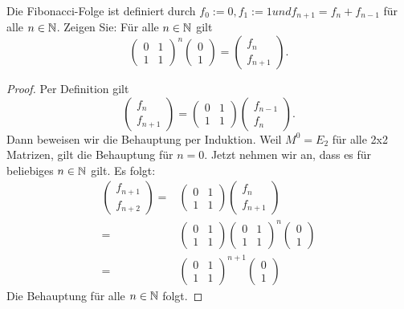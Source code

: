 \begin{Problem}
	Die Fibonacci-Folge ist definiert durch $f_0 := 0, f_1 := 1 und f_{n+1} = f_n + f_{n-1}$ für alle $n \in \mathbb{N}$. Zeigen Sie: F\"{u}r alle $n\in \mathbb{N}$ gilt
	\[
		\begin{pmatrix} 0 & 1 \\ 1 & 1 \end{pmatrix}^n \begin{pmatrix} 0 \\ 1 \end{pmatrix} =\begin{pmatrix} f_n \\ f_{n+1} \end{pmatrix} 
	.\]
\end{Problem}

\begin{proof}
	Per Definition gilt
	\[
		\begin{pmatrix} f_n \\ f_{n+1} \end{pmatrix} =\begin{pmatrix} 0 & 1 \\ 1 & 1 \end{pmatrix} \begin{pmatrix} f_{n-1} \\ f_n \end{pmatrix} 
	.\] 
	Dann beweisen wir die Behauptung per Induktion. Weil $M^0=E_2$ f\"{u}r alle 2x2 Matrizen, gilt die Behauptung f\"{u}r $n=0$. Jetzt nehmen wir an, dass es f\"{u}r beliebiges $n\in \mathbb{N}$ gilt. Es folgt:
	\begin{align*}
		\begin{pmatrix} f_{n+1} \\ f_{n+2} \end{pmatrix} =& \begin{pmatrix} 0 & 1 \\ 1 & 1  \end{pmatrix} \begin{pmatrix} f_{n} \\ f_{n+1} \end{pmatrix} \\
		=& \begin{pmatrix} 0 & 1 \\ 1 & 1 \end{pmatrix} \begin{pmatrix} 0 & 1 \\ 1 & 1 \end{pmatrix}^n \begin{pmatrix} 0 \\ 1 \end{pmatrix} \\
		=& \begin{pmatrix} 0 & 1 \\ 1 & 1 \end{pmatrix}^{n+1}\begin{pmatrix} 0 \\ 1 \end{pmatrix} 
	\end{align*}
	Die Behauptung f\"{u}r alle $n\in \mathbb{N}$ folgt.
\end{proof}

